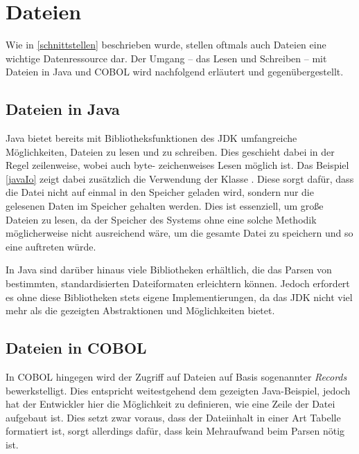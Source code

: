 \section{Dateien} \label{dateien}
Wie in \autoref{schnittstellen} beschrieben wurde, stellen oftmals auch Dateien eine wichtige Datenressource dar. Der Umgang -- das Lesen und Schreiben -- mit Dateien in Java und COBOL wird nachfolgend erläutert und gegenübergestellt.

\subsection*{Dateien in Java}

Java bietet bereits mit Bibliotheksfunktionen des JDK umfangreiche Möglichkeiten, Dateien zu lesen und zu schreiben. Dies geschieht dabei in der Regel zeilenweise, wobei auch byte- \bzw zeichenweises Lesen möglich ist. Das Beispiel \autoref{javaIo} zeigt dabei zusätzlich die Verwendung der Klasse . Diese sorgt dafür, dass die Datei nicht auf einmal in den Speicher geladen wird, sondern nur die gelesenen Daten im Speicher gehalten werden. Dies ist essenziell, um große Dateien zu lesen, da der Speicher des Systems ohne eine solche Methodik möglicherweise nicht ausreichend wäre, um die gesamte Datei zu speichern und so eine  auftreten würde.


In Java sind darüber hinaus viele Bibliotheken erhältlich, die das Parsen von bestimmten, standardisierten Dateiformaten erleichtern können. Jedoch erfordert es ohne diese Bibliotheken stets eigene Implementierungen, da das JDK nicht viel mehr als die gezeigten Abstraktionen und Möglichkeiten bietet.

\subsection*{Dateien in COBOL}\label{filesCobol}

In COBOL hingegen wird der Zugriff auf Dateien auf Basis sogenannter \textit{Records} bewerkstelligt. Dies entspricht weitestgehend dem gezeigten Java-Beispiel, jedoch hat der Entwickler hier die Möglichkeit zu definieren, wie eine Zeile der Datei aufgebaut ist. Dies setzt zwar voraus, dass der Dateiinhalt in einer Art Tabelle formatiert ist, sorgt allerdings dafür, dass kein Mehraufwand beim Parsen nötig ist. 


